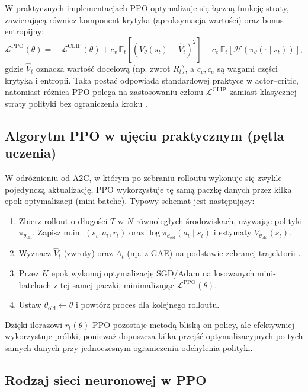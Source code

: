 W praktycznych implementacjach PPO optymalizuje się łączną funkcję straty, zawierającą również
komponent krytyka (aproksymacja wartości) oraz bonus entropijny:
\[
\mathcal{L}^{\text{PPO}}(\theta)
=
-\,\mathcal{L}^{\text{CLIP}}(\theta)
+ c_v\,\mathbb{E}_t\left[\left(V_\theta(s_t)-\hat{V}_t\right)^2\right]
- c_e\,\mathbb{E}_t\left[\mathcal{H}\!\left(\pi_\theta(\cdot\mid s_t)\right)\right],
\]
gdzie $\hat{V}_t$ oznacza wartość docelową (np. zwrot $R_t$), a $c_v, c_e$ są wagami
części krytyka i entropii. Taka postać odpowiada standardowej praktyce w actor--critic, natomiast
różnica PPO polega na zastosowaniu członu $\mathcal{L}^{\text{CLIP}}$ zamiast klasycznej straty polityki
bez ograniczenia kroku \cite{Schulman2017PPO}.

\subsection*{Algorytm PPO w ujęciu praktycznym (pętla uczenia)}

W odróżnieniu od A2C, w którym po zebraniu rolloutu wykonuje się zwykle pojedynczą aktualizację,
PPO wykorzystuje tę samą paczkę danych przez kilka epok optymalizacji (mini-batche).
Typowy schemat jest następujący:
\begin{enumerate}
	\item Zbierz rollout o długości $T$ w $N$ równoległych środowiskach, używając polityki $\pi_{\theta_{\text{old}}}$.
	Zapisz m.in. $(s_t,a_t,r_t)$ oraz $\log \pi_{\theta_{\text{old}}}(a_t\mid s_t)$ i estymaty $V_{\theta_{\text{old}}}(s_t)$.
	\item Wyznacz $\hat{V}_t$ (zwroty) oraz $A_t$ (np. z GAE) na podstawie zebranej trajektorii \cite{Schulman2016GAE}.
	\item Przez $K$ epok wykonuj optymalizację SGD/Adam na losowanych mini-batchach z tej samej paczki,
	minimalizując $\mathcal{L}^{\text{PPO}}(\theta)$.
	\item Ustaw $\theta_{\text{old}} \leftarrow \theta$ i powtórz proces dla kolejnego rolloutu.
\end{enumerate}
Dzięki ilorazowi $r_t(\theta)$ PPO pozostaje metodą bliską on-policy, ale efektywniej wykorzystuje próbki,
ponieważ dopuszcza kilka przejść optymalizacyjnych po tych samych danych przy jednoczesnym
ograniczeniu odchylenia polityki.

\subsection*{Rodzaj sieci neuronowej w PPO}

